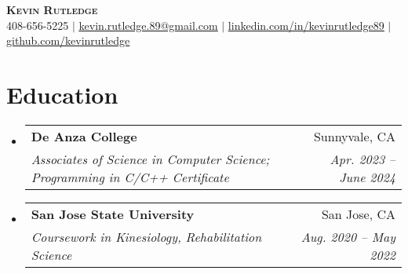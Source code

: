 \documentclass[letterpaper,11pt]{article}
\makeatletter
\newcommand{\resumeSubheading}[4]{
    \vspace{-2pt}\item
    \begin{tabular*}{0.97\textwidth}[t]{l@{\extracolsep{\fill}}r}
        \textbf{#1} & #2 \\
        \textit{\small#3} & \textit{\small #4} \\
    \end{tabular*}\vspace{-7pt}
}
\newenvironment{resumeSubHeadingList}{\begin{itemize}[leftmargin=0.15in, label={}]}{\end{itemize}}
\makeatother
\begin{document}
    \begin{center}
        \textbf{\Huge \scshape Kevin Rutledge} \\ \vspace{1pt}
        \small 408-656-5225 $|$ \href{mailto:kevin.rutledge.89@gmail.com}{\underline{kevin.rutledge.89@gmail.com}} $|$
        \href{https://linkedin.com/in/kevinrutledge89}{\underline{linkedin.com/in/kevinrutledge89}} $|$
        \href{https://github.com/kevinrutledge}{\underline{github.com/kevinrutledge}}
    \end{center}

    \section{Education}
    \label{sec:education}
    \begin{resumeSubHeadingList}
        \resumeSubheading
        {De Anza College}{Sunnyvale, CA}
        {Associates of Science in Computer Science; Programming in C/C++ Certificate}{Apr. 2023 -- June 2024}

        \resumeSubheading
        {San Jose State University}{San Jose, CA}
        {Coursework in Kinesiology, Rehabilitation Science}{Aug. 2020 -- May 2022}
    \end{resumeSubHeadingList}

\end{document}
